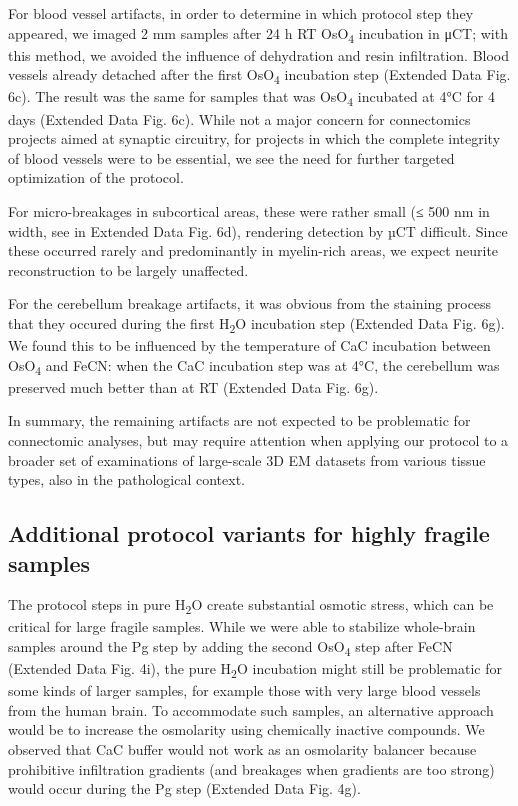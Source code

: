\documentclass{article}
\begin{document}
For blood vessel artifacts, in order to determine in which protocol step they appeared, we imaged 2 mm samples after 24 h RT OsO\textsubscript{4} incubation in μCT; with this method, we avoided the influence of dehydration and resin infiltration. Blood vessels already detached after the first OsO\textsubscript{4} incubation step (Extended Data Fig. 6c). The result was the same for samples that was OsO\textsubscript{4} incubated at 4°C for 4 days (Extended Data Fig. 6c). While not a major concern for connectomics projects aimed at synaptic circuitry, for projects in which the complete integrity of blood vessels were to be essential, we see the need for further targeted optimization of the protocol.  

For micro-breakages in subcortical areas, these were rather small (≤ 500 nm in width, see in Extended Data Fig. 6d), rendering detection by µCT difficult. Since these occurred rarely and predominantly in myelin-rich areas, we expect neurite reconstruction to be largely unaffected.  

For the cerebellum breakage artifacts, it was obvious from the staining process that they occured during the first H\textsubscript{2}O incubation step (Extended Data Fig. 6g). We found this to be influenced by the temperature of CaC incubation between OsO\textsubscript{4} and FeCN: when the CaC incubation step was at 4°C, the cerebellum was preserved much better than at RT (Extended Data Fig. 6g). 

In summary, the remaining artifacts are not expected to be problematic for connectomic analyses, but may require attention when applying our protocol to a broader set of examinations of large-scale 3D EM datasets from various tissue types, also in the pathological context. 

\subsection*{Additional protocol variants for highly fragile samples}


The protocol steps in pure H\textsubscript{2}O create substantial osmotic stress, which can be critical for large fragile samples. While we were able to stabilize whole-brain samples around the Pg step by adding the second OsO\textsubscript{4} step after FeCN (Extended Data Fig. 4i), the pure H\textsubscript{2}O incubation might still be problematic for some kinds of larger samples, for example those with very large blood vessels from the human brain. To accommodate such samples, an alternative approach would be to increase the osmolarity using chemically inactive compounds. We observed that CaC buffer would not work as an osmolarity balancer because prohibitive infiltration gradients (and breakages when gradients are too strong) would occur during the Pg step (Extended Data Fig. 4g).  
\end{document}

